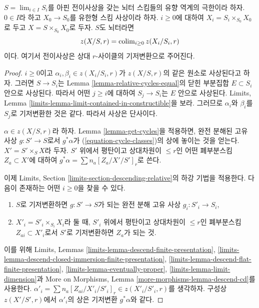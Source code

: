 \begin{lemma}
\label{lemma-descend-through-limit}
$S = \lim_{i \in I} S_i$를 아핀 전이사상을 갖는 뇌터 스킴들의
유향 역계의 극한이라 하자. $0 \in I$라 하고
$X_0 \to S_0$를 유한형 스킴 사상이라 하자. $i \geq 0$에 대하여
$X_i = S_i \times_{S_0} X_0$로 두고
$X = S \times_{S_0} X_0$로 두자. $S$도 뇌터라면
$$
z(X/S, r) = \mathop{\mathrm{colim}}\nolimits_{i \geq 0} z(X_i/S_i, r)
$$
이다. 여기서 전이사상은 상대 $r$-사이클의 기저변환으로 주어진다.
\end{lemma}

\begin{proof}
$i \geq 0$이고 $\alpha_i, \beta_i \in z(X_i/S_i, r)$가
$z(X/S, r)$의 같은 원소로 사상된다고 하자. 그러면 $S \to S_i$는
Lemma \ref{lemma-relative-cycles-equal}의 닫힌 부분집합
$E \subset S_i$ 안으로 사상된다. 따라서 어떤 $j \geq i$에 대하여
$S_j \to S_i$는 $E$ 안으로 사상된다. Limits, Lemma
\ref{limits-lemma-limit-contained-in-constructible}을 보라. 그러므로
$\alpha_i$와 $\beta_i$를 $S_j$로 기저변환한 것은 같다. 따라서
사상은 단사이다.

\medskip\noindent
$\alpha \in z(X/S, r)$라 하자. Lemma \ref{lemma-get-cycles}을
적용하면, 완전 분해된 고유 사상 $g : S' \to S$로서 $g^*\alpha$가
(\ref{equation-cycle-classes})의 상에 놓이는 것을 얻는다.
$X' = S' \times_S X$라 두자. $S'$ 위에서 평탄이고 상대차원이
$\leq r$인 어떤 폐부분스킴 $Z_a \subset X'$에 대하여
$g^*\alpha = \sum n_a [Z_a/X'/S']_r$로 쓴다.

\medskip\noindent
이제 Limits, Section \ref{limits-section-descending-relative}의 하강
기법을 적용한다. 다음이 존재하는 어떤 $i \geq 0$을 찾을 수 있다.
\begin{enumerate}
\item $S$로 기저변환하면 $g : S' \to S$가 되는 완전 분해 고유 사상
$g_i : S'_i \to S_i$,
\item $X'_i = S'_i \times_{S_i} X_i$라 둘 때, $S'_i$ 위에서 평탄이고
상대차원이 $\leq r$인 폐부분스킴 $Z_{ai} \subset X'_i$로서
$S'$로 기저변환하면 $Z_a$가 되는 것.
\end{enumerate}
이를 위해 Limits, Lemmas
\ref{limits-lemma-descend-finite-presentation},
\ref{limits-lemma-descend-closed-immersion-finite-presentation},
\ref{limits-lemma-descend-flat-finite-presentation},
\ref{limits-lemma-eventually-proper},
\ref{limits-lemma-limit-dimension}과 More on Morphisms, Lemma
\ref{more-morphisms-lemma-descend-cd}를 사용한다.
$\alpha'_i = \sum n_a [Z_{ai}/X'_i/S'_i]_r \in z(X'_i/S'_i, r)$를
생각하자. 구성상 $z(X'/S', r)$에서 $\alpha'_i$의 상은 기저변환
$g^*\alpha$와 같다.


\end{proof}
